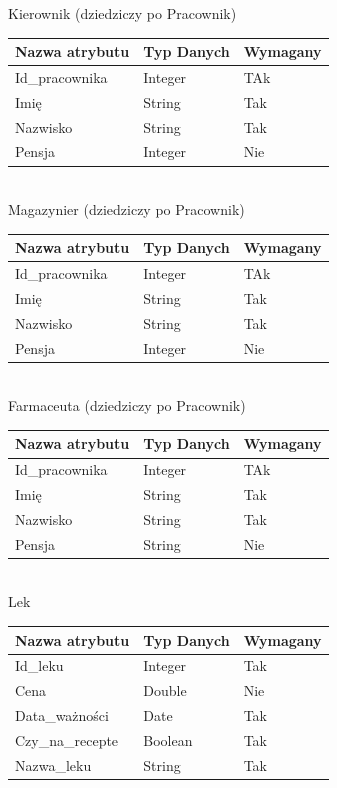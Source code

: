 \documentclass[a4paper, 11pt]{article}
\begin{document}
Kierownik (dziedziczy po Pracownik)\\
\begin{tabular}{|l|l|l|} \hline
Nazwa  atrybutu	& Typ Danych	& Wymagany \\ \hline
Id\_pracownika	& Integer	& TAk\\ \hline
Imię	& String	& Tak\\ \hline
Nazwisko	& String	& Tak\\ \hline
Pensja	& Integer	& Nie\\ \hline
\end{tabular}\\[1cm]	

Magazynier (dziedziczy po Pracownik)\\
\begin{tabular}{|l|l|l|} \hline
Nazwa  atrybutu	& Typ Danych	& Wymagany \\ \hline
Id\_pracownika	& Integer	& TAk\\ \hline
Imię	& String	& Tak\\ \hline
Nazwisko	& String	& Tak\\ \hline
Pensja	& Integer	& Nie\\ \hline
\end{tabular}\\[1cm]	

Farmaceuta (dziedziczy po Pracownik)\\
\begin{tabular}{|l|l|l|} \hline
Nazwa  atrybutu	& Typ Danych	& Wymagany \\ \hline
Id\_pracownika	& Integer	& TAk\\ \hline
Imię	& String	& Tak\\ \hline
Nazwisko	& String	& Tak\\ \hline
Pensja	& String	& Nie\\ \hline
\end{tabular}\\[1cm]

Lek\\
\begin{tabular}{|l|l|l|} \hline
Nazwa  atrybutu	& Typ Danych	& Wymagany \\ \hline
Id\_leku	& Integer	&Tak\\ \hline
Cena	&Double	&Nie\\ \hline
Data\_ważności	&Date	&Tak\\ \hline
Czy\_na\_recepte &	Boolean	&Tak\\ \hline
Nazwa\_leku	&String	&Tak\\ \hline
\end{tabular}\\[1cm]	
\end{document}
